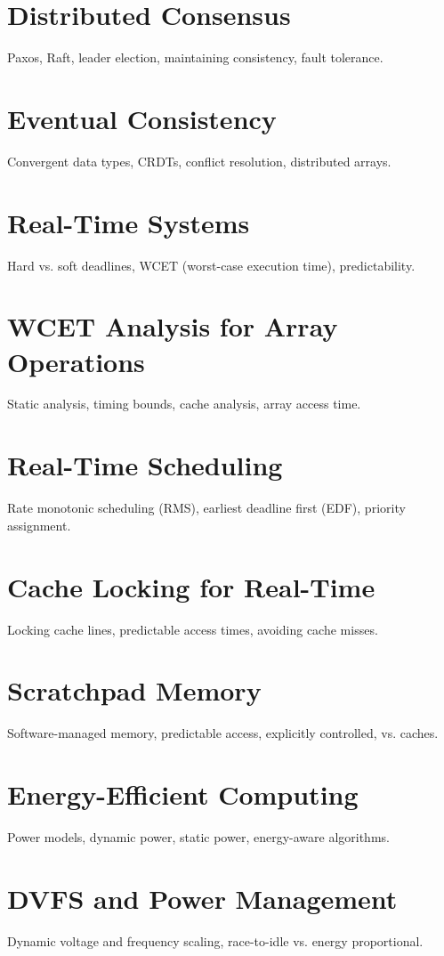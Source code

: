 \chapter{Distributed Consensus}
Paxos, Raft, leader election, maintaining consistency, fault tolerance.

\chapter{Eventual Consistency}
Convergent data types, CRDTs, conflict resolution, distributed arrays.


\chapter{Real-Time Systems}
Hard vs. soft deadlines, WCET (worst-case execution time), predictability.

\chapter{WCET Analysis for Array Operations}
Static analysis, timing bounds, cache analysis, array access time.

\chapter{Real-Time Scheduling}
Rate monotonic scheduling (RMS), earliest deadline first (EDF), priority assignment.

\chapter{Cache Locking for Real-Time}
Locking cache lines, predictable access times, avoiding cache misses.

\chapter{Scratchpad Memory}
Software-managed memory, predictable access, explicitly controlled, vs. caches.

\chapter{Energy-Efficient Computing}
Power models, dynamic power, static power, energy-aware algorithms.

\chapter{DVFS and Power Management}
Dynamic voltage and frequency scaling, race-to-idle vs. energy proportional.

